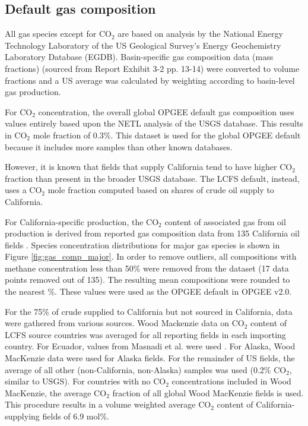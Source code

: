 \documentclass[11pt]{report}
\begin{document}
\subsection{Default gas composition}

All gas species except for CO$_2$ are based on analysis by the National Energy Technology Laboratory \cite{Littlefield2019} of the US Geological Survey's Energy Geochemistry Laboratory Database (EGDB). Basin-specific gas composition data (mass fractions) (sourced from Report Exhibit 3-2 pp. 13-14) were converted to volume fractions and a US average was calculated by weighting according to basin-level gas production. 

For CO$_2$ concentration, the overall global OPGEE default gas composition uses values entirely based upon the NETL analysis of the USGS database. This results in CO$_2$ mole fraction of 0.3\%. This dataset is used for the global OPGEE default because it includes more samples than other known databases.

However, it is known that fields that supply California tend to have higher CO$_2$ fraction than present in the broader USGS database. The LCFS default, instead, uses a CO$_2$ mole fraction computed based on shares of crude oil supply to California. 

For California-specific production, the CO$_2$ content of associated gas from oil production is derived from reported gas composition data from 135 California oil fields \cite{Lee2011}. Species concentration distributions for major gas species is shown in Figure \ref{fig:gas_comp_major}. In order to remove outliers, all compositions with methane concentration less than 50\% were removed from the dataset (17 data points removed out of 135). The resulting mean compositions were rounded to the nearest \%. These values were used as the OPGEE default in OPGEE v2.0.

For the 75\% of crude supplied to California but not sourced in California, data were gathered from various sources. Wood Mackenzie data on CO$_2$ content of LCFS source countries was averaged for all reporting fields in each importing country.  For Ecuador, values from Masnadi et al. were used \cite{Masnadi2018}. For Alaska, Wood MacKenzie data were used for Alaska fields. For the remainder of US fields, the average of all other (non-California, non-Alaska) samples was used (0.2\% CO$_2$, similar to USGS). For countries with no CO$_2$ concentrations included in Wood MacKenzie, the average CO$_2$ fraction of all global Wood MacKenzie fields is used. This procedure results in a volume weighted average CO$_2$ content of California-supplying fields of 6.9 mol\%.
\end{document}
